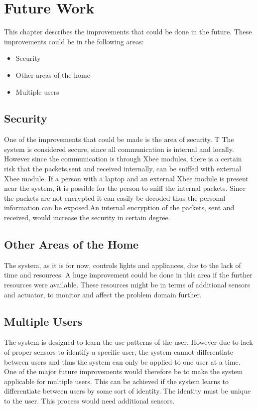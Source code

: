 \chapter{Future Work}
\label{chap:future_work}
This chapter describes the improvements that could be done in the future. These improvements could be in the following areas:
\begin{itemize}
\item Security
\item Other areas of the home
\item Multiple users
\end{itemize}

\section{Security}
One of the improvements that could be made is the area of security. T
The system is considered secure, since all communication is internal and locally. However since the communication is through Xbee modules, there is a certain risk that the packets,sent and received internally, can be sniffed with external Xbee module. If a person with a laptop and an external Xbee module is present near the system, it is possible for the person to sniff the internal packets. Since the packets are not encrypted it can easily be decoded thus the personal information can be exposed.An internal encryption of the packets, sent and received, would increase the security in certain degree.

\section{Other Areas of the Home}
The system, as it is for now, controls lights and appliances, due to the lack of time and resources. A huge improvement could be done in this area if the further resources were available. These resources might be in terms of additional sensors and actuator, to monitor and affect the problem domain further.
\section{Multiple Users}
The system is designed to learn the use patterns of the user. However due to lack of proper sensors to identify a specific user, the system cannot differentiate between users and thus the system can only be applied to one user at a time. One of the major future improvements would therefore be to make the system applicable for multiple users. This can be achieved if the system learns to differentiate between users by some sort of identity. The identity must be unique to the user. This process would need additional sensors. 
